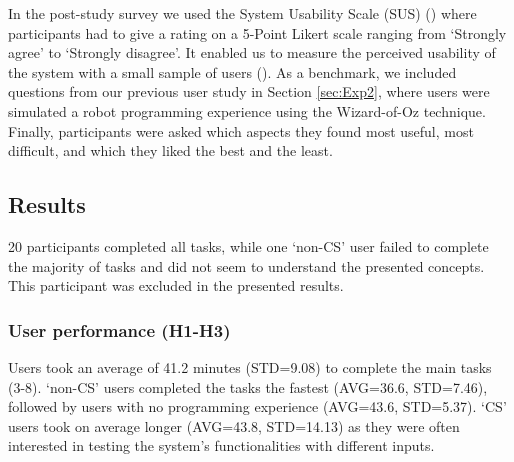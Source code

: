 In the post-study survey we used the System Usability Scale (SUS) (\cite{brooke1996sus}) where participants had to give a rating on a 5-Point Likert scale ranging from `Strongly agree' to `Strongly disagree'.
It enabled us to measure the perceived usability of the system with a small sample of users (\cite{tullis2004comparison}).
As a benchmark, we included questions from our previous user study in Section \ref{sec:Exp2}, where users were simulated a robot programming experience using the Wizard-of-Oz technique.
Finally, participants were asked which aspects they found most useful, most difficult, and which they liked the best and the least.



\subsection{Results}
20 participants completed all tasks, while one `non-CS' user failed to complete the majority of tasks and did not seem to understand the presented concepts.
This participant was excluded in the presented results.

\subsubsection*{User performance (H1-H3)} 
Users took an average of 41.2 minutes (STD=9.08) to complete the main tasks (3-8).
`non-CS' users completed the tasks the fastest (AVG=36.6, STD=7.46), followed by users with no programming experience (AVG=43.6, STD=5.37).
`CS' users took on average longer (AVG=43.8, STD=14.13) as they were often interested in testing the system's functionalities with different inputs.


